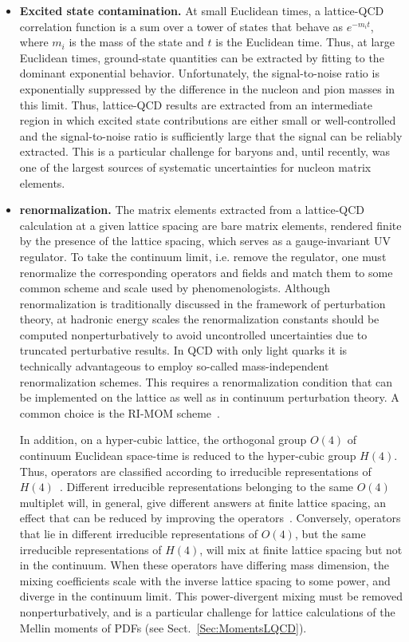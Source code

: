 \begin{itemize}
\item {\bfseries Excited state contamination.} At small Euclidean times, a lattice-QCD correlation function
is a sum over a tower of states that behave as $e^{-m_it}$, where $m_i$ is the 
mass of the state and $t$ is the Euclidean time. Thus, at large Euclidean times,
ground-state quantities can be extracted by fitting to the dominant exponential behavior.
Unfortunately, the signal-to-noise ratio
is exponentially suppressed by the difference in the nucleon and pion masses in this limit. Thus, lattice-QCD results
are extracted from an intermediate region in which excited state contributions are 
either small or well-controlled and the signal-to-noise ratio is sufficiently large that
the signal can be reliably extracted. This is a particular challenge for baryons and,
until recently, was one of the largest sources of systematic uncertainties for
nucleon matrix elements.

\item {\bfseries renormalization.} The matrix elements extracted from a 
lattice-QCD calculation at a given lattice spacing are bare matrix elements,
rendered finite by the presence of the lattice spacing, which serves
as a gauge-invariant UV regulator. To take the continuum limit,
i.e. remove the regulator, one must renormalize the corresponding
operators and fields and match them to some common scheme and scale used 
by phenomenologists. Although renormalization is traditionally
discussed in the framework of perturbation theory, at hadronic energy
scales the renormalization constants should be computed
nonperturbatively to avoid uncontrolled uncertainties due to 
truncated perturbative results.
%
In QCD with only light quarks it is technically
advantageous to employ so-called mass-independent renormalization
schemes.
%
This requires a renormalization condition that can be
implemented on the lattice as well as in continuum perturbation
theory. A common choice is the RI-MOM scheme~\cite{Martinelli:1994ty}.

In addition, on a hyper-cubic lattice, the orthogonal group $O(4)$ of
continuum Euclidean space-time is reduced to the hyper-cubic group
$H(4)$.
%
Thus, operators are classified according to irreducible
representations of $H(4)$~\cite{Gockeler:1996mu}.
%
Different
irreducible representations belonging to the same $O(4)$ multiplet
will, in general, give different answers at finite lattice spacing, an
effect that can be reduced by improving the
operators~\cite{Gockeler:2004wp}.
%
Conversely, operators that lie in
different irreducible representations of $O(4)$, but the same irreducible
representations of $H(4)$, will mix at finite lattice spacing but not
in the continuum. When these operators have differing mass dimension,
the mixing coefficients scale with the inverse lattice spacing to some
power, and diverge in the continuum limit.
%
This power-divergent mixing
must be removed nonperturbatively, and is a particular challenge for
lattice calculations of the Mellin moments of PDFs (see
Sect.~\ref{Sec:MomentsLQCD}).


\end{itemize}
